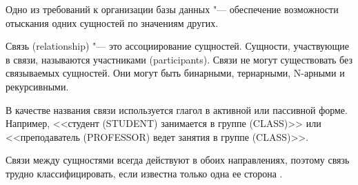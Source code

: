 Одно из требований к организации базы данных "--- обеспечение возможности отыскания одних сущностей по значениям других.

Связь (relationship) "--- это ассоциирование сущностей. Сущности, участвующие в
связи, называются участниками (participants). Связи не могут существовать без связываемых сущностей. Они могут быть бинарными, тернарными, N-арными и рекурсивными.

В качестве названия связи
используется глагол в активной или пассивной форме. Например, <<студент (STUDENT)
занимается в группе (CLASS)>> или <<преподаватель (PROFESSOR) ведет занятия в
группе (CLASS)>>.

Связи между сущностями всегда действуют в обоих направлениях, поэтому связь трудно классифицировать, если известна только одна ее сторона \cite{5}.